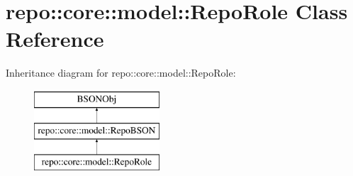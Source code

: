 \hypertarget{classrepo_1_1core_1_1model_1_1_repo_role}{}\section{repo\+:\+:core\+:\+:model\+:\+:Repo\+Role Class Reference}
\label{classrepo_1_1core_1_1model_1_1_repo_role}
Inheritance diagram for repo\+:\+:core\+:\+:model\+:\+:Repo\+Role\+:\begin{figure}[H]
\begin{center}
\leavevmode
\includegraphics[height=3.000000cm]{classrepo_1_1core_1_1model_1_1_repo_role}
\end{center}
\end{figure}
